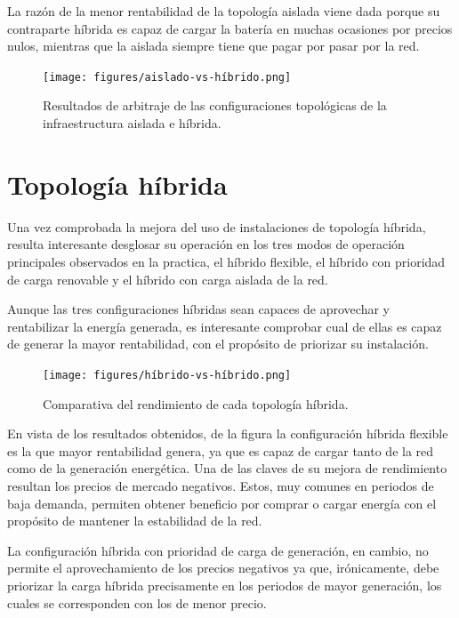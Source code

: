 La razón de la menor rentabilidad de la topología aislada viene dada porque su contraparte híbrida es capaz de cargar la batería en muchas ocasiones por precios nulos, mientras que la aislada siempre tiene que pagar por pasar por la red.

\begin{figure}
  \centering
  \texttt{[image: figures/aislado-vs-híbrido.png]}
  \caption[Resultados de arbitraje de configuraciones topológicas.]{Resultados de arbitraje de las configuraciones topológicas de la infraestructura aislada e híbrida.}
  \label{fig:aislado-vs-híbrido}
\end{figure}

\section{Topología híbrida}
\label{makereference7.4}

Una vez comprobada la mejora del uso de instalaciones de topología híbrida, resulta interesante desglosar su operación en los tres modos de operación principales observados en la practica, el híbrido flexible, el híbrido con prioridad de carga renovable y el híbrido con carga aislada de la red.

Aunque las tres configuraciones híbridas sean capaces de aprovechar y rentabilizar la energía generada, es interesante comprobar cual de ellas es capaz de generar la mayor rentabilidad, con el propósito de priorizar su instalación.

\begin{figure}
  \centering
  \texttt{[image: figures/híbrido-vs-híbrido.png]}
  \caption[Comparativa del rendimiento de cada topología híbrida.]{Comparativa del rendimiento de cada topología híbrida.}
  \label{fig:híbrido-vs-híbrido}
\end{figure}

En vista de los resultados obtenidos, de la figura  la configuración híbrida flexible es la que mayor rentabilidad genera, ya que es capaz de cargar tanto de la red como de la generación energética. Una de las claves de su mejora de rendimiento resultan los precios de mercado negativos. Estos, muy comunes en periodos de baja demanda, permiten obtener beneficio por comprar o cargar energía con el propósito de mantener la estabilidad de la red.

La configuración híbrida con prioridad de carga de generación, en cambio, no permite el aprovechamiento de los precios negativos ya que, irónicamente, debe priorizar la carga híbrida precisamente en los periodos de mayor generación, los cuales se corresponden con los de menor precio.

